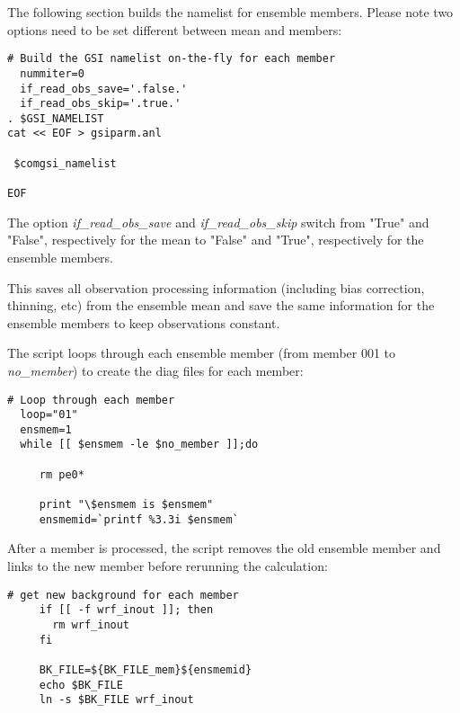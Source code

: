 The following section builds the namelist for ensemble members. Please note two options need to be set different between mean and members:
\begin{scriptsize}
\begin{verbatim}
# Build the GSI namelist on-the-fly for each member
  nummiter=0
  if_read_obs_save='.false.'
  if_read_obs_skip='.true.'
. $GSI_NAMELIST
cat << EOF > gsiparm.anl

 $comgsi_namelist

EOF
\end{verbatim}
\end{scriptsize}

The option \textit{if\_read\_obs\_save} and \textit{if\_read\_obs\_skip} switch from "True" and "False", respectively for the mean to "False" and "True", respectively for the ensemble members.

This saves all observation processing information (including bias correction, thinning, etc) from the ensemble mean and save the same information for the ensemble members to keep observations  constant.

The script loops through each ensemble member (from member 001 to \textit{no\_member}) to create the diag files for each member:

\begin{scriptsize}
\begin{verbatim}
# Loop through each member
  loop="01"
  ensmem=1
  while [[ $ensmem -le $no_member ]];do

     rm pe0*

     print "\$ensmem is $ensmem"
     ensmemid=`printf %3.3i $ensmem`
\end{verbatim}
\end{scriptsize}

After a member is processed, the script removes the old ensemble member and links to the new member before rerunning the calculation:
\begin{scriptsize}
\begin{verbatim}
# get new background for each member
     if [[ -f wrf_inout ]]; then
       rm wrf_inout
     fi

     BK_FILE=${BK_FILE_mem}${ensmemid}
     echo $BK_FILE
     ln -s $BK_FILE wrf_inout
\end{verbatim}
\end{scriptsize}


